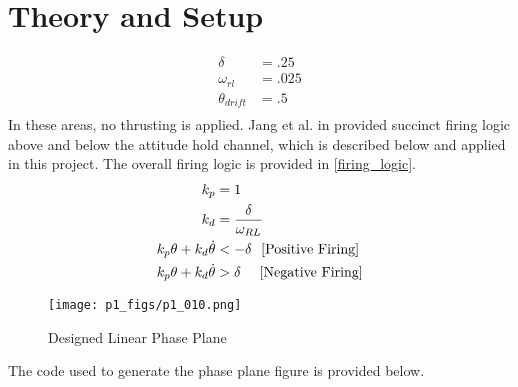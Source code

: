 \section{Theory and Setup}
\begin{equation*}
    \begin{split}
        \delta &=  .25 \\ 
        \omega_{rl} &= .025\\
        \theta_{drift} &= .5 \\
    \end{split}
\end{equation*}
In these areas, no thrusting is applied. Jang et al. in \cite{jang2010} provided succinct firing logic above and below the attitude hold channel, which is described below and applied in this project. The overall firing logic is provided in \ref{firing_logic}.  
\begin{equation*}
    \begin{split}
        k_p &= 1 \\
        k_d &= \frac{\delta}{\omega_{RL}} \\
        k_p\theta + k_d\dot{\theta} &< -\delta \,\,\, \left[\text{Positive Firing}\right] \\
        k_p\theta + k_d\dot{\theta} &> \delta \,\,\,\,\,\,\, \left[\text{Negative Firing}\right] \\
    \end{split}
\end{equation*}
\begin{figure}[H]
    \centering
    \texttt{[image: p1\_figs/p1\_010.png]}
    \caption{Designed Linear Phase Plane}
    \label{fig:p1_lpp}
\end{figure}
The code used to generate the phase plane figure is provided below. 
